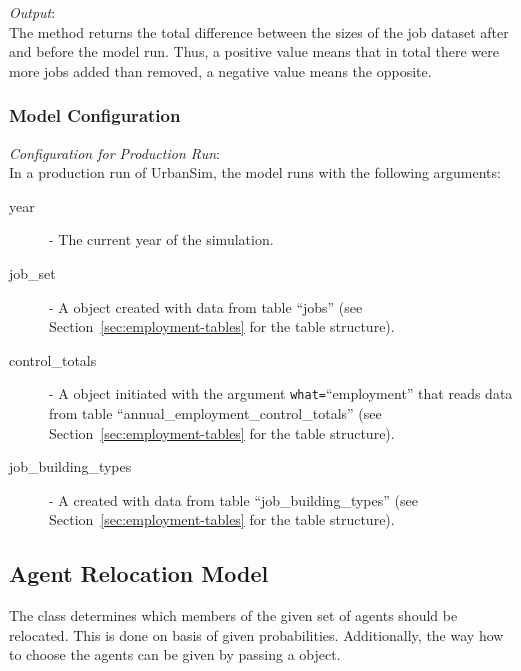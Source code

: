 {\it Output}:~\\[1mm]
The method returns the total difference between the sizes of the job
dataset after and before the model run. Thus, a positive value means that in
total there were more jobs added than removed, a negative value means
the opposite.

\subsubsection{Model Configuration}
\modelsindex
%
{\em Configuration for Production Run}:\\[1mm]
In a production run of UrbanSim, the model runs with the following arguments:
\begin{description}
\item[year] - The current year of the simulation.
\item[job_set] - A  object created with data from
  table ``jobs'' (see Section~\ref{sec:employment-tables}
  for the table structure).
\item[control_totals] - A  object initiated with the
  argument \verb|what=|``employment'' that reads data from table
  ``annual_employment_control_totals'' (see
  Section~\ref{sec:employment-tables} for the table structure).
\item[job_building_types] - A  created with data from table 
``job_building_types'' (see Section~\ref{sec:employment-tables}
  for the table structure).
\end{description}



%
\subsection{Agent Relocation Model}
\modelsindex
%
\label{sec:agent-relocation-model}

The class  determines which members of the given
set of agents should be relocated. This is done on basis of given
probabilities. Additionally, the way how to choose the agents can be given by
passing a  object.

%
